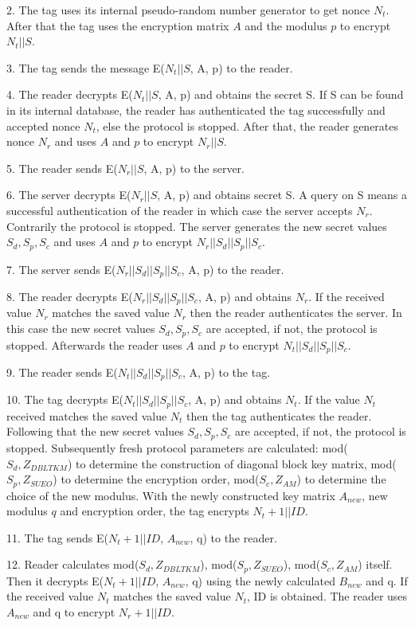    2. The tag uses its internal pseudo-random number generator to get nonce $N_t$. After that the tag uses the encryption matrix $A$ and the modulus $p$ to 
    encrypt $N_t||S$.

    3. The tag sends the message E($N_t||S$, A, p) to the reader. 

    4. The reader decrypts E($N_t||S$, A, p) and obtains the secret S. If S can be found in its internal database, the reader has authenticated the tag successfully and accepted nonce $N_t$, else the protocol is stopped. 
        After that, the reader generates nonce $N_r$ and uses $A$ and $p$ to encrypt $N_r||S$. 

    5. The reader sends E($N_r||S$, A, p) to the server. 

    6. The server decrypts E($N_r||S$, A, p) and obtains secret S. A query on S means a successful authentication of the reader in which case the server accepts $N_r$. Contrarily the protocol is stopped.
        The server generates the new secret values $S_d, S_p, S_c$ and uses $A$ and $p$ to encrypt $N_r||S_d||S_p||S_c$.

    7. The server sends E($N_r||S_d||S_p||S_c$, A, p) to the reader. 

    8. The reader decrypts E($N_r||S_d||S_p||S_c$, A, p) and obtains $N_r$. If the received value $N_r$ matches the saved value $N_r$ then the reader authenticates 
    the server. In this case the new secret values 
        $S_d,S_p,S_c$ are accepted, if not, the protocol is stopped. Afterwards the reader uses $A$ and $p$ to encrypt $N_t||S_d||S_p||S_c$. 

    9. The reader sends E($N_t||S_d||S_p||S_c$, A, p) to the tag. 

    10. The tag decrypts E($N_t||S_d||S_p||S_c$, A, p) and obtains $N_t$. If the value $N_t$ received matches the saved value $N_t$ then the tag authenticates the reader. Following that the new secret values 
        $S_d,S_p,S_c$ are accepted, if not, the protocol is stopped. Subsequently fresh protocol parameters are calculated: mod($S_d, Z_{DBLTKM}$) to determine the construction of diagonal block key matrix, 
        mod($S_p, Z_{SUEO}$) to determine the encryption order, mod($S_c, Z_{AM}$) to determine the choice of the new modulus. With the newly constructed key matrix $A_{new}$, new modulus $q$ and encryption order, the tag 
        encrypts $N_t+1||ID$.

    11. The tag sends E($N_t+1||ID$, $A_{new}$, q) to the reader.
    
    12. Reader calculates mod($S_d, Z_{DBLTKM}$), mod($S_p, Z_{SUEO}$), mod($S_c, Z_{AM}$) itself. Then it decrypts E($N_t+1||ID$, $A_{new}$, q) 
    using the newly calculated $B_{new}$ and q. If the received value $N_t$ matches the saved value $N_t$, ID is obtained. The reader uses $A_{new}$ and q to encrypt $N_r+1||ID$. 

